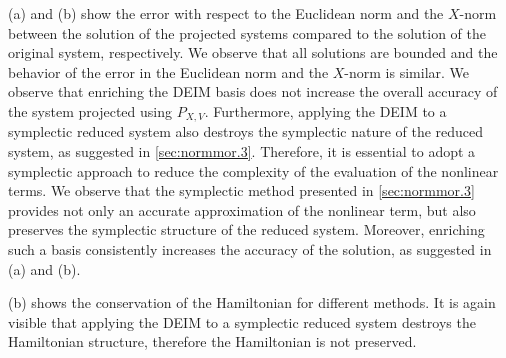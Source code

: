 (a) and (b) show the error with respect to the Euclidean norm and the $X$-norm between the solution of the projected systems compared to the solution of the original system, respectively. We observe that all solutions are bounded and the behavior of the error in the Euclidean norm and the $X$-norm is similar. We observe that enriching the DEIM basis does not increase the overall accuracy of the system projected using $P_{X,V}$. Furthermore, applying the DEIM to a symplectic reduced system also destroys the symplectic nature of the reduced system, as suggested in \cref{sec:normmor.3}. Therefore, it is essential to adopt a symplectic approach to reduce the complexity of the evaluation of the nonlinear terms. We observe that the symplectic method presented in \cref{sec:normmor.3} provides not only an accurate approximation of the nonlinear term, but also preserves the symplectic structure of the reduced system. Moreover, enriching such a basis consistently increases the accuracy of the solution, as suggested in (a) and (b).

(b) shows the conservation of the Hamiltonian for different methods. It is again visible that applying the DEIM to a symplectic reduced system destroys the Hamiltonian structure, therefore the Hamiltonian is not preserved.


